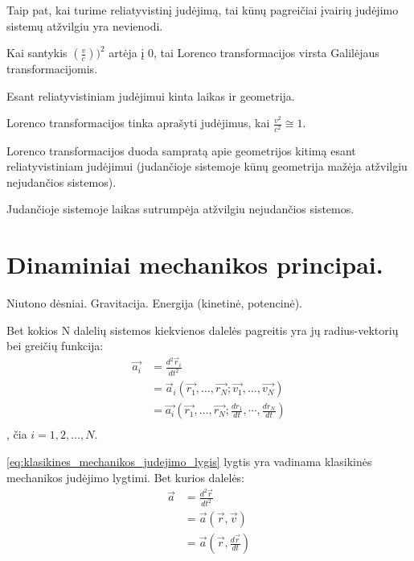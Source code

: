 Taip pat, kai turime reliatyvistinį judėjimą, tai kūnų pagreičiai
įvairių judėjimo sistemų atžvilgiu yra nevienodi.

Kai santykis $\left( \frac{v}{c} \right))^{2}$ artėja į 0, tai
Lorenco transformacijos virsta Galilėjaus transformacijomis.

\begin{remember}
  \item Esant reliatyvistiniam judėjimui kinta laikas ir geometrija.
  \item Lorenco transformacijos tinka aprašyti judėjimus, kai
    $\frac{v^{2}}{c^{2}} \cong 1$.
  \item Lorenco transformacijos duoda sampratą apie geometrijos
    kitimą esant reliatyvistiniam judėjimui (judančioje sistemoje
    kūnų geometrija mažėja atžvilgiu nejudančios sistemos).
  \item Judančioje sistemoje laikas sutrumpėja atžvilgiu
    nejudančios sistemos.
\end{remember}

\section{Dinaminiai mechanikos principai.}
Niutono dėsniai. Gravitacija. Energija (kinetinė, potencinė).

Bet kokios N dalelių sistemos kiekvienos dalelės pagreitis yra jų
radius-vektorių bei greičių funkcija:
\begin{align}
  \vec{a_{i}}
  &= \frac{d^{2}\vec{r}_{i}}{dt^{2}} \\
  &= \vec{a}_{i}(%
    \vec{r_{1}},\ldots,\vec{r_{N}}; \vec{v_{1}},\ldots,\vec{v_{N}}) \\
  &= \vec{a_{i}} \left(%
    \vec{r_{1}},\ldots,\vec{r_{N}}; %
    \frac{dr_{1}}{dt},\cdots,\frac{dr_{N}}{dt} \right) \\
  \label{eq:klasikines_mechanikos_judejimo_lygis}
\end{align},
čia $i = 1,2,\ldots,N$.

\ref{eq:klasikines_mechanikos_judejimo_lygis} lygtis yra vadinama
klasikinės mechanikos judėjimo lygtimi. Bet kurios dalelės:
\begin{align*}
  \vec{a}
  &= \frac{d^{2}\vec{r}}{dt^{2}} \\
  &= \vec{a}(\vec{r}, \vec{v}) \\
  &= \vec{a} (\vec{r}, \frac{d\vec{r}}{dt}) \\
\end{align*}

